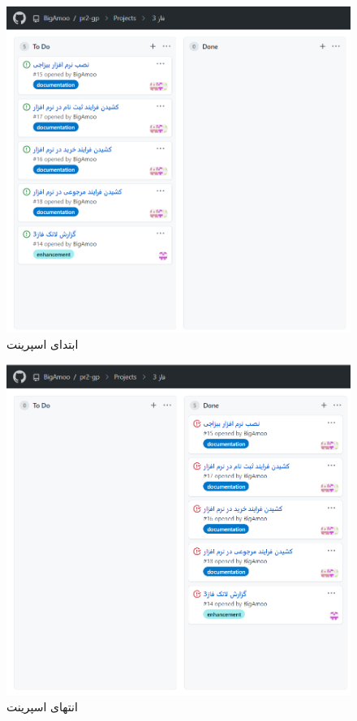 \documentclass[12pt,a4paper]{article}
\begin{document}
\subsection{} \label{section.report.taskBoard}

	\begin{figure}[h!]
	\begin{center}
		\includegraphics[width=14cm]{images/screenshot_7.png}	
	\end{center}
	\caption{ابتدای اسپرینت}
\end{figure}

\begin{figure}[h!]
	\begin{center}
		\includegraphics[width=14cm]{images/screenshot_1.png}
	\end{center}
	\caption{انتهای اسپرینت}
\end{figure}


		
\end{document}
